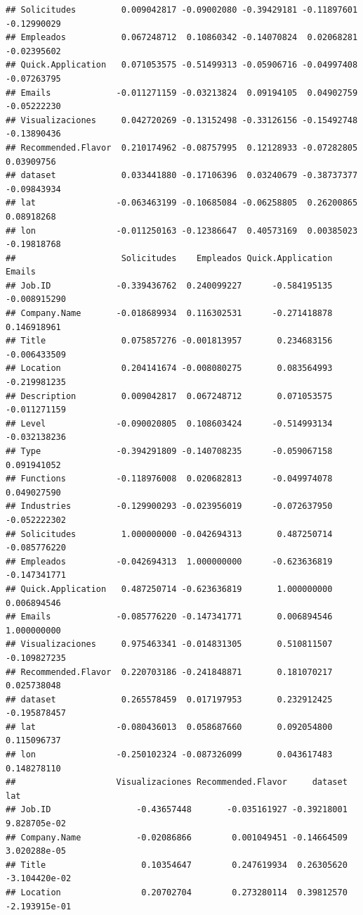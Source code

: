 \documentclass[
]{article}
\begin{document}
\begin{verbatim}
## Solicitudes         0.009042817 -0.09002080 -0.39429181 -0.11897601 -0.12990029
## Empleados           0.067248712  0.10860342 -0.14070824  0.02068281 -0.02395602
## Quick.Application   0.071053575 -0.51499313 -0.05906716 -0.04997408 -0.07263795
## Emails             -0.011271159 -0.03213824  0.09194105  0.04902759 -0.05222230
## Visualizaciones     0.042720269 -0.13152498 -0.33126156 -0.15492748 -0.13890436
## Recommended.Flavor  0.210174962 -0.08757995  0.12128933 -0.07282805  0.03909756
## dataset             0.033441880 -0.17106396  0.03240679 -0.38737377 -0.09843934
## lat                -0.063463199 -0.10685084 -0.06258805  0.26200865  0.08918268
## lon                -0.011250163 -0.12386647  0.40573169  0.00385023 -0.19818768
##                     Solicitudes    Empleados Quick.Application       Emails
## Job.ID             -0.339436762  0.240099227      -0.584195135 -0.008915290
## Company.Name       -0.018689934  0.116302531      -0.271418878  0.146918961
## Title               0.075857276 -0.001813957       0.234683156 -0.006433509
## Location            0.204141674 -0.008080275       0.083564993 -0.219981235
## Description         0.009042817  0.067248712       0.071053575 -0.011271159
## Level              -0.090020805  0.108603424      -0.514993134 -0.032138236
## Type               -0.394291809 -0.140708235      -0.059067158  0.091941052
## Functions          -0.118976008  0.020682813      -0.049974078  0.049027590
## Industries         -0.129900293 -0.023956019      -0.072637950 -0.052222302
## Solicitudes         1.000000000 -0.042694313       0.487250714 -0.085776220
## Empleados          -0.042694313  1.000000000      -0.623636819 -0.147341771
## Quick.Application   0.487250714 -0.623636819       1.000000000  0.006894546
## Emails             -0.085776220 -0.147341771       0.006894546  1.000000000
## Visualizaciones     0.975463341 -0.014831305       0.510811507 -0.109827235
## Recommended.Flavor  0.220703186 -0.241848871       0.181070217  0.025738048
## dataset             0.265578459  0.017197953       0.232912425 -0.195878457
## lat                -0.080436013  0.058687660       0.092054800  0.115096737
## lon                -0.250102324 -0.087326099       0.043617483  0.148278110
##                    Visualizaciones Recommended.Flavor     dataset           lat
## Job.ID                 -0.43657448       -0.035161927 -0.39218001  9.828705e-02
## Company.Name           -0.02086866        0.001049451 -0.14664509  3.020288e-05
## Title                   0.10354647        0.247619934  0.26305620 -3.104420e-02
## Location                0.20702704        0.273280114  0.39812570 -2.193915e-01

\end{verbatim}
\end{document}
